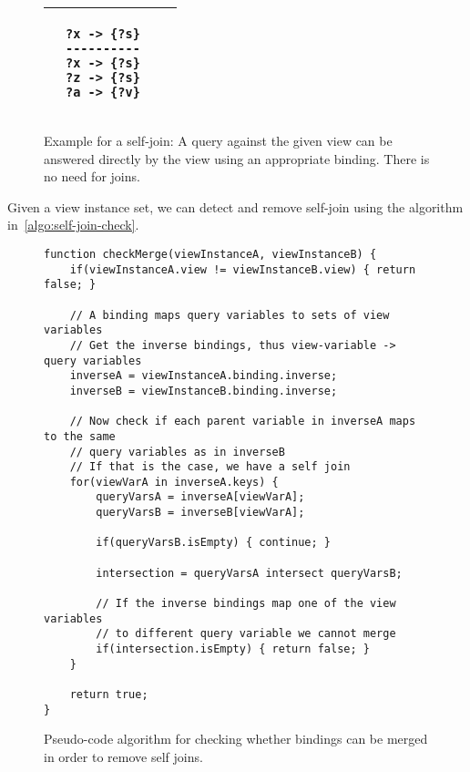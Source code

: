 \documentclass[a4paper,twoside,bibtotoc,abstracton,12pt,BCOR=15mm]{scrreprt}
\begin{document}
\begin{figure}[!h]
\begin{tabular}{llll}
&

\begin{minipage}{3cm}
\begin{scriptsize}
\begin{verbatim}
?x -> {?s}
----------
?x -> {?s}
?z -> {?s}
?a -> {?v}
\end{verbatim}
\end{scriptsize}
\end{minipage}

\\

\bottomrule
\end{tabular}
\caption{Example for a self-join: A query against the given view can be answered directly by the view using an appropriate binding. There is no need for joins.}
\label{fig:running-example}
\end{figure}

Given a view instance set, we can detect and remove self-join using the algorithm in~\autoref{algo:self-join-check}.

\begin{figure}[!h]
\begin{lstlisting}
function checkMerge(viewInstanceA, viewInstanceB) {
    if(viewInstanceA.view != viewInstanceB.view) { return false; }

	// A binding maps query variables to sets of view variables
	// Get the inverse bindings, thus view-variable -> query variables
	inverseA = viewInstanceA.binding.inverse;
	inverseB = viewInstanceB.binding.inverse;
		
	// Now check if each parent variable in inverseA maps to the same
	// query variables as in inverseB
	// If that is the case, we have a self join
	for(viewVarA in inverseA.keys) {
	    queryVarsA = inverseA[viewVarA];
	    queryVarsB = inverseB[viewVarA];
	    
	    if(queryVarsB.isEmpty) { continue; }
	    
	    intersection = queryVarsA intersect queryVarsB; 
	    
	    // If the inverse bindings map one of the view variables
	    // to different query variable we cannot merge
	    if(intersection.isEmpty) { return false; }
	}
	
	return true;
}
\end{lstlisting}
\caption{Pseudo-code algorithm for checking whether bindings can be merged in order to remove self joins.}
\label{algo:self-join-check}
\end{figure}
\end{document}
